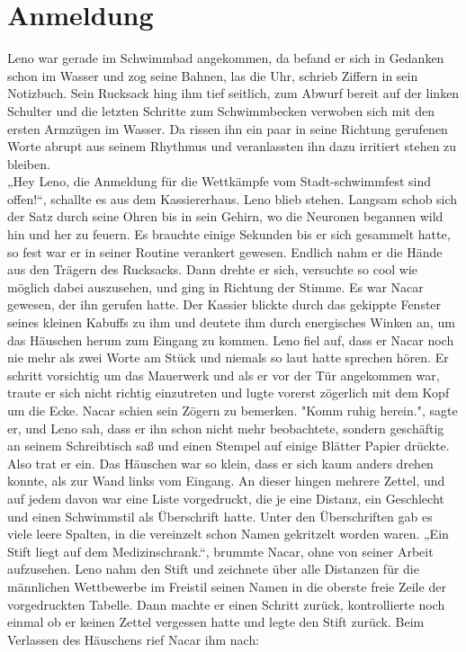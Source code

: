 \documentclass[ngerman,smalldemyvopaper,11pt,oneside,onecolumn,openright,extrafontsizes]{memoir}
\begin{document}
\chapter{Anmeldung}
Leno war gerade im Schwimmbad angekommen, da befand er sich in Gedanken schon im Wasser und zog seine Bahnen, las die Uhr, schrieb Ziffern in sein Notizbuch. Sein Rucksack hing ihm tief seitlich, zum Abwurf bereit auf der linken Schulter und die letzten Schritte zum Schwimmbecken verwoben sich mit den ersten Armzügen im Wasser. Da rissen ihn ein paar in seine Richtung gerufenen Worte abrupt aus seinem Rhythmus und veranlassten ihn dazu irritiert stehen zu bleiben.\\
„Hey Leno, die Anmeldung für die Wettkämpfe vom Stadt-schwimmfest sind offen!“, schallte es aus dem Kassiererhaus. Leno blieb stehen. Langsam schob sich der Satz durch seine Ohren bis in sein Gehirn, wo die Neuronen begannen wild hin und her zu feuern. Es brauchte einige Sekunden bis er sich gesammelt hatte, so fest war er in seiner Routine verankert gewesen. Endlich nahm er die Hände aus den Trägern des Rucksacks. Dann drehte er sich, versuchte so cool wie möglich dabei auszusehen, und ging in Richtung der Stimme. Es war Nacar gewesen, der ihn gerufen hatte. Der Kassier blickte durch das gekippte Fenster seines kleinen Kabuffs zu ihm und deutete ihm durch energisches Winken an, um das Häuschen herum zum Eingang zu kommen. Leno fiel auf, dass er Nacar noch nie mehr als zwei Worte am Stück und niemals so laut hatte sprechen hören. Er schritt vorsichtig um das Mauerwerk und als er vor der Tür angekommen war, traute er sich nicht richtig einzutreten und lugte vorerst zögerlich mit dem Kopf um die Ecke. Nacar schien sein Zögern zu bemerken. "Komm ruhig herein.", sagte er, und Leno sah, dass er ihn schon nicht mehr beobachtete, sondern geschäftig an seinem Schreibtisch saß und einen Stempel auf einige Blätter Papier drückte. Also trat er ein. Das Häuschen war so klein, dass er sich kaum anders drehen konnte, als zur Wand links vom Eingang. An dieser hingen mehrere Zettel, und auf jedem davon war eine Liste vorgedruckt, die je eine Distanz, ein Geschlecht und einen Schwimmstil als Überschrift hatte. Unter den Überschriften gab es viele leere Spalten, in die vereinzelt schon Namen gekritzelt worden waren. „Ein Stift liegt auf dem Medizinschrank.“, brummte Nacar, ohne von seiner Arbeit aufzusehen. Leno nahm den Stift und zeichnete über alle Distanzen für die männlichen Wettbewerbe im Freistil seinen Namen in die oberste freie Zeile der vorgedruckten Tabelle. Dann machte er einen Schritt zurück, kontrollierte noch einmal ob er keinen Zettel vergessen hatte und legte den Stift zurück. Beim Verlassen des Häuschens rief Nacar ihm nach:\\
\end{document}
